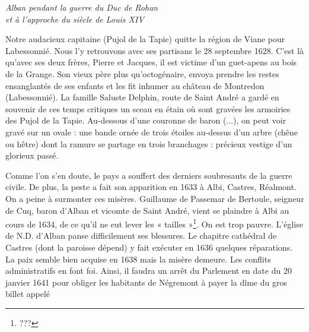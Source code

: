 \begin{center}
    {\Large\itshape
    Alban pendant la guerre du Duc de Rohan\\
    et à l'approche du siècle de Louis XIV
    }
\end{center}

\vspace{1em}

Notre audacieux capitaine (Pujol de la Tapie) quitte la région de Viane
pour Labessonnié. Nous l'y retrouvons avec ses partisans le 28 septembre
1628. C'est là qu'avec ses deux frères, Pierre et Jacques, il est victime
d'un guet-apens au bois de la Grange. Son vieux père plus qu'octogénaire,
envoya prendre les restes ensanglantés de ses enfants et les fit inhumer
au château de Montredon (Labessonnié). La famille Saluste Delphin, route
de Saint André a gardé en souvenir de ces temps critiques un sceau en
étain où sont gravées les armoiries des Pujol de la Tapie. Au-dessous
d'une couronne de baron (...), on peut voir gravé sur un ovale : une
bande ornée de trois étoiles au-dessus d'un arbre (chêne ou hêtre) dont
la ramure se partage en trois branchages : précieux vestige d'un glorieux
passé.

Comme l'on s'en doute, le pays a souffert des derniers soubresauts de
la guerre civile. De plus, la peste a fait son apparition en 1633 à Albi,
Castres, Réalmont. On a peine à surmonter ces misères. Guillaume de
Passemar de Bertoule, seigneur de Cuq, baron d'Alban et vicomte de
Saint André, vient se plaindre à Albi au cours de 1634, de ce qu'il ne
eut lever les « tailles »\footnote{???}. On est trop pauvre. L'église de N.D. d'Alban
panse difficilement ses blessures. Le chapitre cathédral de Castres
(dont la paroisse dépend) y fait exécuter en 1636 quelques réparations.
La paix semble bien acquise en 1638 mais la misère demeure. Les
conflits administratifs en font foi. Ainsi, il faudra un arrêt du
Parlement en date du 20 janvier 1641 pour obliger les habitants de
Négremont à payer la dîme du gros billet appelé